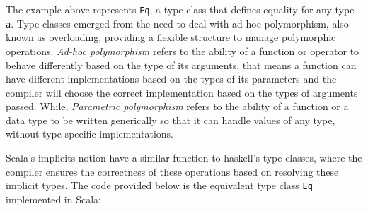The example above represents \lstinline{Eq}, a type class that defines equality for any type \lstinline{a}. Type classes emerged from the need to deal with ad-hoc polymorphism, also known as overloading, providing a flexible structure to manage polymorphic operations. 
\textit{Ad-hoc polymorphism} refers to the ability of a function or operator to behave differently based on the type of its arguments, that means a function can have different implementations based on the types of its parameters and the compiler will choose the correct implementation based on the types of arguments passed.
 While, \textit{Parametric polymorphism} refers to the ability of a function or a data type to be written generically so that it can handle values of any type, without type-specific implementations.


Scala’s implicits notion have a similar function to haskell's type classes, where the compiler ensures the correctness of these operations based on resolving these implicit types. The code provided below is the equivalent type class \lstinline{Eq} implemented in Scala: 




\LIMPA